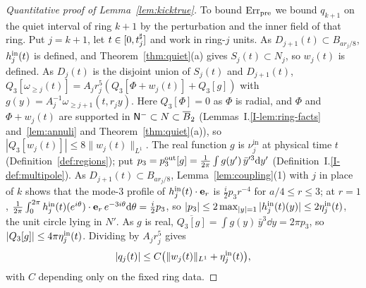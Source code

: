 \begin{proof}[Quantitative proof of Lemma~\ref{lem:kicktrue}]
To bound $\mathrm{Err}_{\mathrm{pre}}$ we bound $q_{k+1}$ on the quiet interval of ring $k+1$ by the
perturbation and the inner field of that ring.
Put $j=k+1$, let $t\in[0,t^\sharp_j]$ and work in ring-$j$ units. As
$D_{j+1}(t)\subset B_{ar_j/8}$, $h^{\mathrm{in}}_j(t)$ is defined, and
Theorem~\ref{thm:quiet}(a) gives $S_j(t)\subset N_j$, so $w_j(t)$ is defined. As
$D_j(t)$ is the disjoint union of $S_j(t)$ and $D_{j+1}(t)$,
$Q_3[\omega_{\ge j}(t)]=A_jr_j^5(Q_3[\Phi+w_j(t)]+Q_3[g])$ with
$g(y)=A_j^{-1}\omega_{\ge j+1}(t,r_jy)$. Here $Q_3[\Phi]=0$ as $\Phi$ is radial,
and $\Phi$ and $\Phi+w_j(t)$ are supported in $\mathsf{N}^{-}\subset N\subset\overline B_2$
(Lemmas~I.\ref{I-lem:ring-facts} and~\ref{lem:annuli} and Theorem~\ref{thm:quiet}(a)), so
$|Q_3[w_j(t)]|\le8\|w_j(t)\|_{L^1}$. The real function $g$ is
$\nu^{\mathrm{in}}_j$ at physical time $t$ (Definition~\ref{def:regions}); put
$p_3=p^{\mathrm{out}}_3[g]=\frac1{2\pi}\int g(y')\,\bar y'^3\dd y'$
(Definition~I.\ref{I-def:multipole}). As $D_{j+1}(t)\subset B_{ar_j/8}$,
Lemma~\ref{lem:coupling}\textup{(1)} with $j$ in place of $k$ shows that the
mode-$3$ profile of $h^{\mathrm{in}}_j(t)\cdot\textbf{e}_r$ is $\frac i2p_3r^{-4}$ for
$a/4\le r\le3$; at $r=1$,
$\frac1{2\pi}\int_0^{2\pi}h^{\mathrm{in}}_j(t)(e^{i\theta})\cdot\textbf{e}_r\,e^{-3i\theta}\dd\theta=\frac i2p_3$,
so $|p_3|\le2\max_{|y|=1}|h^{\mathrm{in}}_j(t)(y)|\le2\eta^{\mathrm{in}}_j(t)$, the unit circle
lying in $N'$. As $g$ is real, $\overline{Q_3[g]}=\int g(y)\,\bar y^3\dd y=2\pi p_3$,
so $|Q_3[g]|\le4\pi\eta^{\mathrm{in}}_j(t)$. Dividing by $A_jr_j^5$ gives
\begin{equation}
\label{eq:kicktrue-quiet-moment}
|q_j(t)|\le C\big(\|w_j(t)\|_{L^1}+\eta^{\mathrm{in}}_j(t)\big),
\end{equation}
with $C$ depending only on the fixed ring data.


\end{proof}

